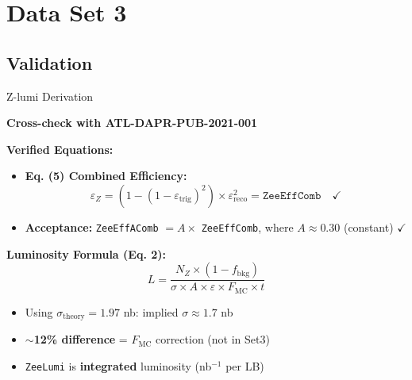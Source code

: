 \section{Data Set 3}
\subsection{Validation}
\begin{frame}{Z-lumi Derivation}
    
    \textbf{Cross-check with ATL-DAPR-PUB-2021-001}
    
    \vspace{0.3cm}
    
    \textbf{Verified Equations:}
    \begin{itemize}
        \item \textbf{Eq. (5) Combined Efficiency:} 
        \[
        \varepsilon_Z = \left(1 - (1-\varepsilon_{\text{trig}})^2\right) \times \varepsilon_{\text{reco}}^2 = \texttt{ZeeEffComb} \quad \checkmark
        \]
        \item \textbf{Acceptance:} \texttt{ZeeEffAComb} $= A \times$ \texttt{ZeeEffComb}, where $A \approx 0.30$ (constant) $\checkmark$
    \end{itemize}
    
    \vspace{0.3cm}
    
    \textbf{Luminosity Formula (Eq. 2):}
    \[
    L = \frac{N_Z \times (1-f_{\text{bkg}})}{\sigma \times A \times \varepsilon \times F_{\text{MC}} \times t}
    \]
    
    \begin{itemize}
        \item Using $\sigma_{\text{theory}} = 1.97$ nb: implied $\sigma \approx 1.7$ nb
        \item \textbf{$\sim$12\% difference} = $F_{\text{MC}}$ correction (not in Set3)
        \item \texttt{ZeeLumi} is \textbf{integrated} luminosity (nb$^{-1}$ per LB)
    \end{itemize}
    
\end{frame}
